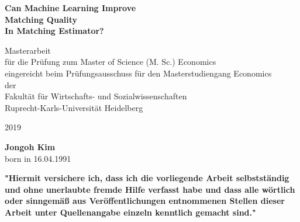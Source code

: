 \documentclass[11pt,a4paper,oneside]{article}
\begin{document}
\begin{titlepage}
   \begin{center}
        \vspace*{1cm}
 
        \textbf{Can Machine Learning Improve\\Matching Quality\\ In Matching Estimator?}
     
     
        \vspace{1.5cm}
     
        Masterarbeit\\
        für die Prüfung zum Master of Science (M. Sc.) Economics\\
        eingereicht beim Prüfungsausschuss für den Masterstudiengang Economics\\
        der\\
        Fakultät für Wirtschafts- und Sozialwissenschaften\\
        Ruprecht-Karls-Universität Heidelberg\\
           
        \vspace{0.8cm}
 
        2019
        \vspace{2.5cm}
        \vfill
   \end{center}
   \textbf{Jongoh Kim}\\
    born in 16.04.1991
\end{titlepage}

\textbf{"Hiermit versichere ich, dass ich die vorliegende Arbeit selbstständig
und ohne unerlaubte fremde Hilfe verfasst habe und dass alle wörtlich
oder sinngemäß aus Veröffentlichungen entnommenen Stellen dieser
Arbeit unter Quellenangabe einzeln kenntlich gemacht sind."}

\newpage
\tableofcontents
\newpage
{}
\end{document}

